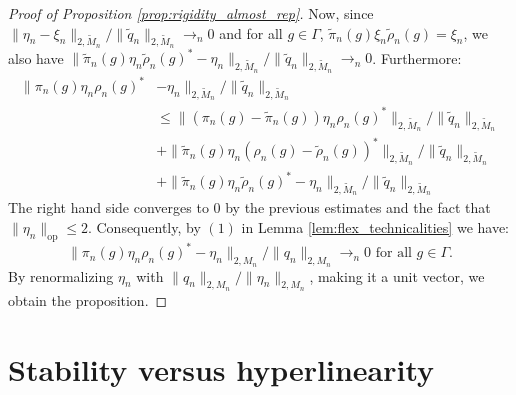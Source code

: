 \documentclass[11pt]{amsart}
\DeclareMathOperator{\op}{op}
\theoremstyle{definition}
\theoremstyle{remark}
\theoremstyle{definition}
\begin{document}
\begin{proof}[Proof of Proposition \ref{prop:rigidity_almost_rep}]
 Now, since $\| \eta_n - \xi_n \|_{2, \widetilde{M}_n} / \| \tilde q_n \|_{2,\widetilde{M}_n} \to_n 0$ and for all $g \in \Gamma$, $\tilde \pi_n(g) \xi_n \tilde \rho_n(g) = \xi_n$, we also have $\| \tilde\pi_n(g)  \eta_n\tilde \rho_n(g)^* - \eta_n\|_{2,\widetilde{M}_n} / \|\tilde q_n \|_{2,\widetilde M_n} \to_n 0$. Furthermore:
 \begin{align*}
    \| \pi_n(g)  \eta_n\rho_n(g)^* &- \eta_n\|_{2,\widetilde{M}_n} / \|\tilde q_n \|_{2,\widetilde M_n} \\
    &\leq \| (\pi_n(g) - \tilde \pi_n(g)) \eta_n \rho_n(g)^* \|_{2, \widetilde{M}_n} / \| \tilde q_n \|_{2, \widetilde{M}_n}\\
    &+\| \tilde \pi_n(g) \eta_n (\rho_n(g) - \tilde\rho_n(g))^* \|_{2, \widetilde{M}_n}/ \| \tilde q_n \|_{2, \widetilde{M}_n}\\
    &+ \| \widetilde\pi_n(g)  \eta_n \widetilde\rho_n(g)^* - \eta_n\|_{2,\widetilde{M}_n} / \|\tilde q_n \|_{2,\widetilde M_n} 
 \end{align*}
 The right hand side converges to $0$ by the previous estimates and the fact that $\| \eta_n \|_{\op} \leq 2$.
 Consequently, by $(1)$ in Lemma \ref{lem:flex_technicalities} we have: 
$$\| \pi_n(g)  \eta_n\rho_n(g)^* - \eta_n\|_{2,M_n} / \|q_n \|_{2,M_n}  \to_n 0 \text{ for all $g \in \Gamma$}.$$
By renormalizing $\eta_n$ with $\| q_n \|_{2, M_n} / \| \eta_n \|_{2,M_n}$, making it a unit vector, we obtain the proposition.
\end{proof}

\section{Stability versus hyperlinearity}\label{sec:non-hyperlinear}
\end{document}
